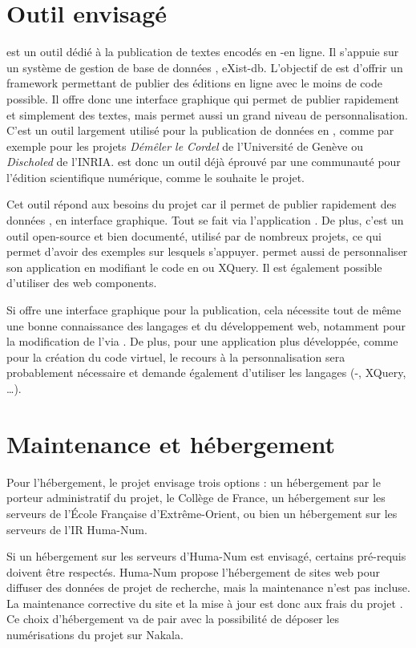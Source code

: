 \section*{Outil envisagé}
\href{https://teipublisher.com/exist/apps/tei-publisher/doc/documentation.xml?odd=docbook&view=div&id=selected-use-cases&hash=3.6.5#introduction}{\tp} est un outil dédié à la publication de textes encodés en \XML-\TEI en ligne. Il s’appuie sur un système de gestion de base de données \XML, eXist-db. L’objectif de \tp est d’offrir un framework permettant de publier des éditions en ligne avec le moins de code possible. Il offre donc une interface graphique qui permet de publier rapidement et simplement des textes, mais permet aussi un grand niveau de personnalisation. C’est un outil largement utilisé pour la publication de données en \TEI, comme par exemple pour les projets \textit{Démêler le Cordel} de l’Université de Genève ou \textit{Discholed} de l’INRIA. \tp est donc un outil déjà éprouvé par une communauté pour l’édition scientifique numérique, comme le souhaite le projet. 

Cet outil répond aux besoins du projet \COREL car il permet de publier rapidement des données \TEI, en interface graphique. Tout se fait via l’application \tp. De plus, c’est un outil open-source et bien documenté, utilisé par de nombreux projets, ce qui permet d’avoir des exemples sur lesquels s’appuyer. \tp permet aussi de personnaliser son application en modifiant le code en \HTML ou XQuery. Il est également possible d’utiliser des web components.

Si \tp offre une interface graphique pour la publication, cela nécessite tout de même une bonne connaissance des langages \XML et du développement web, notamment pour la modification de l’\ODD via \tp. De plus, pour une application plus développée, comme pour la création du code virtuel, le recours à la personnalisation sera probablement nécessaire et demande également d’utiliser les langages \XML (\XML-\TEI, XQuery, \ODD…). 

\newpage
\section*{Maintenance et hébergement}
Pour l’hébergement, le projet envisage trois options : un hébergement par le porteur administratif du projet, le Collège de France, un hébergement sur les serveurs de l’École Française d’Extrême-Orient, ou bien un hébergement sur les serveurs de l’IR Huma-Num. 

Si un hébergement sur les serveurs d’Huma-Num est envisagé, certains pré-requis doivent être respectés. Huma-Num propose l’hébergement de sites web pour diffuser des données de projet de recherche, mais la maintenance n’est pas incluse. La maintenance corrective du site et la mise à jour est donc aux frais du projet \COREL. Ce choix d’hébergement va de pair avec la possibilité de déposer les numérisations du projet sur Nakala. 

